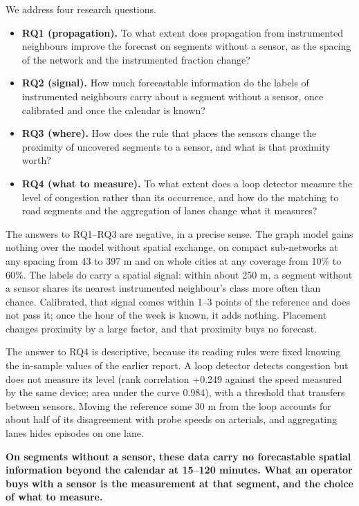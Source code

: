 We address four research questions.

\begin{itemize}
\item \textbf{RQ1 (propagation).} To what extent does propagation from instrumented neighbours improve the forecast on segments without a sensor, as the spacing of the network and the instrumented fraction change?
\item \textbf{RQ2 (signal).} How much forecastable information do the labels of instrumented neighbours carry about a segment without a sensor, once calibrated and once the calendar is known?
\item \textbf{RQ3 (where).} How does the rule that places the sensors change the proximity of uncovered segments to a sensor, and what is that proximity worth?
\item \textbf{RQ4 (what to measure).} To what extent does a loop detector measure the level of congestion rather than its occurrence, and how do the matching to road segments and the aggregation of lanes change what it measures?
\end{itemize}

The answers to RQ1–RQ3 are negative, in a precise sense. The graph model gains nothing over the model without spatial exchange, on compact sub-networks at any spacing from 43 to 397 m and on whole cities at any coverage from 10\% to 60\%. The labels do carry a spatial signal: within about 250 m, a segment without a sensor shares its nearest instrumented neighbour's class more often than chance. Calibrated, that signal comes within 1–3 points of the reference and does not pass it; once the hour of the week is known, it adds nothing. Placement changes proximity by a large factor, and that proximity buys no forecast.

The answer to RQ4 is descriptive, because its reading rules were fixed knowing the in-sample values of the earlier report. A loop detector detects congestion but does not measure its level (rank correlation +0.249 against the speed measured by the same device; area under the curve 0.984), with a threshold that transfers between sensors. Moving the reference some 30 m from the loop accounts for about half of its disagreement with probe speeds on arterials, and aggregating lanes hides episodes on one lane.

\textbf{On segments without a sensor, these data carry no forecastable spatial information beyond the calendar at 15–120 minutes. What an operator buys with a sensor is the measurement at that segment, and the choice of what to measure.}


